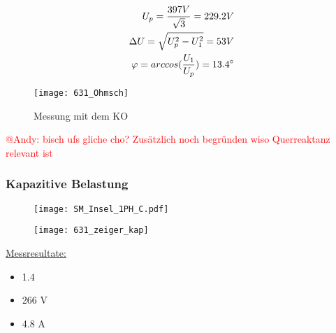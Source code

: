 \begin{flushleft}
\begin{equation} \label{eq:Up}
\begin{aligned} 
	U_p = \frac{397 V}{\sqrt{3}} = 229.2 V \\
	\Delta U = \sqrt{U_p^2-U_1^2} = 53 V \\
	\varphi = arccos(\frac{U_1}{U_p}) = 13.4\degree
\end{aligned}
\end{equation} 




\begin{figure}[H]
    \centering
    \texttt{[image: 631\_Ohmsch]}
    \caption{Messung mit dem KO}
    \label{fig:abb1}
\end{figure}

\textcolor{red}{@Andy: bisch ufs gliche cho? Zusätzlich noch begründen wiso Querreaktanz relevant ist}
\newpage




\subsubsection{Kapazitive Belastung}

\begin{figure}[H]
\begin{minipage}[t]{0.55\textwidth}
\centering
\texttt{[image: SM\_Insel\_1PH\_C.pdf]}
\label{fig:abb1}
\end{minipage}
\begin{minipage}[t]{0.4\textwidth}
\centering
\texttt{[image: 631\_zeiger\_kap]}
    \label{fig:abb1}
\end{minipage}
\end{figure}


\underline{Messresultate:}\\
\vspace{0.3cm}


\begin{itemize}
\item {}            1.4\degree
\item {}            266 V
\item {}            4.8 A
\end{itemize}

\vspace{0.5cm}


\end{flushleft}
